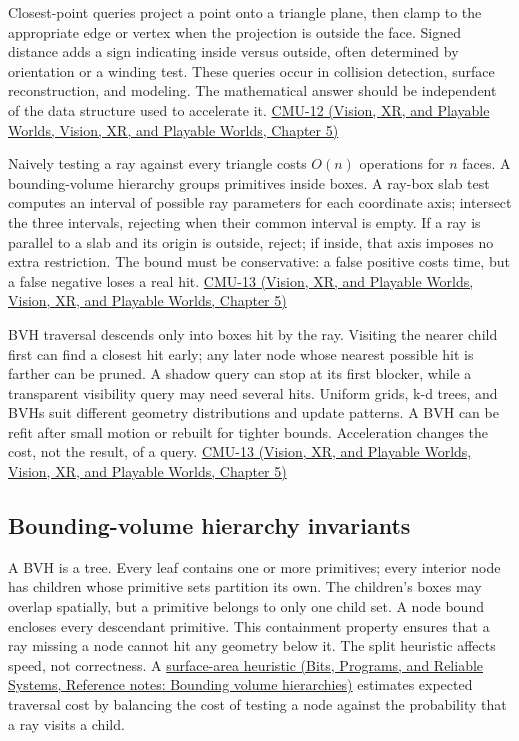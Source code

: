 Closest-point queries project a point onto a triangle plane, then clamp to the appropriate edge or vertex when the projection is outside the face. Signed distance adds a sign indicating inside versus outside, often determined by orientation or a winding test. These queries occur in collision detection, surface reconstruction, and modeling. The mathematical answer should be independent of the data structure used to accelerate it. \href{../07-Vision-XR-and-Playable-Worlds/main.pdf\#nameddest=04-visual-computing-ii-ch036-cmu-12---geometric-queries}{CMU-12 (Vision, XR, and Playable Worlds, Vision, XR, and Playable Worlds, Chapter 5)}

Naively testing a ray against every triangle costs \(O(n)\) operations for \(n\) faces. A bounding-volume hierarchy groups primitives inside boxes. A ray-box slab test computes an interval of possible ray parameters for each coordinate axis; intersect the three intervals, rejecting when their common interval is empty. If a ray is parallel to a slab and its origin is outside, reject; if inside, that axis imposes no extra restriction. The bound must be conservative: a false positive costs time, but a false negative loses a real hit. \href{../07-Vision-XR-and-Playable-Worlds/main.pdf\#nameddest=04-visual-computing-ii-ch036-cmu-13---spatial-data-structures}{CMU-13 (Vision, XR, and Playable Worlds, Vision, XR, and Playable Worlds, Chapter 5)}

BVH traversal descends only into boxes hit by the ray. Visiting the nearer child first can find a closest hit early; any later node whose nearest possible hit is farther can be pruned. A shadow query can stop at its first blocker, while a transparent visibility query may need several hits. Uniform grids, k-d trees, and BVHs suit different geometry distributions and update patterns. A BVH can be refit after small motion or rebuilt for tighter bounds. Acceleration changes the cost, not the result, of a query. \href{../07-Vision-XR-and-Playable-Worlds/main.pdf\#nameddest=04-visual-computing-ii-ch036-cmu-13---spatial-data-structures}{CMU-13 (Vision, XR, and Playable Worlds, Vision, XR, and Playable Worlds, Chapter 5)}

\subsection{Bounding-volume hierarchy invariants}\label{04-visual-computing-ii-ch029-bounding-volume-hierarchy-invariants}

A BVH is a tree. Every leaf contains one or more primitives; every interior node has children whose primitive sets partition its own. The children's boxes may overlap spatially, but a primitive belongs to only one child set. A node bound encloses every descendant primitive. This containment property ensures that a ray missing a node cannot hit any geometry below it. The split heuristic affects speed, not correctness. A \href{../01-Bits-Programs-and-Reliable-Systems/main.pdf\#nameddest=appendix-0b426c47dd78}{surface-area heuristic (Bits, Programs, and Reliable Systems, Reference notes: Bounding volume hierarchies)} estimates expected traversal cost by balancing the cost of testing a node against the probability that a ray visits a child.

